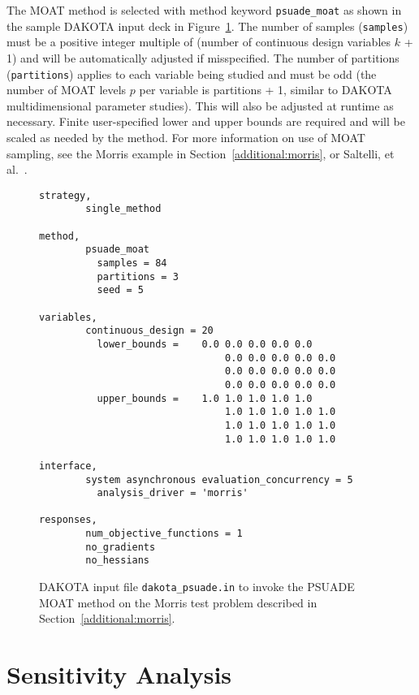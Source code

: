 The MOAT method is selected with method keyword {\tt psuade\_moat} as
shown in the sample DAKOTA input deck in Figure~\ref{FIG:moat_input}.
The number of samples ({\tt samples}) must be a positive integer
multiple of (number of continuous design variables $k$ + 1) and will
be automatically adjusted if misspecified.  The number of partitions
({\tt partitions}) applies to each variable being studied and must be
odd (the number of MOAT levels $p$ per variable is partitions + 1,
similar to DAKOTA multidimensional parameter studies).  This will also
be adjusted at runtime as necessary.  Finite user-specified lower and
upper bounds are required and will be scaled as needed by the method.
For more information on use of MOAT sampling, see the Morris example
in Section~\ref{additional:morris}, or Saltelli, et al.~\cite{Sal04}.

\begin{figure}[ht!]
\centering
\begin{bigbox}
\begin{small}
\begin{verbatim}
strategy,
        single_method

method,
        psuade_moat
          samples = 84
          partitions = 3
          seed = 5

variables,
        continuous_design = 20
          lower_bounds =    0.0 0.0 0.0 0.0 0.0
                                0.0 0.0 0.0 0.0 0.0
                                0.0 0.0 0.0 0.0 0.0
                                0.0 0.0 0.0 0.0 0.0
          upper_bounds =    1.0 1.0 1.0 1.0 1.0
                                1.0 1.0 1.0 1.0 1.0
                                1.0 1.0 1.0 1.0 1.0
                                1.0 1.0 1.0 1.0 1.0

interface,
        system asynchronous evaluation_concurrency = 5
          analysis_driver = 'morris'

responses,
        num_objective_functions = 1
        no_gradients
        no_hessians
\end{verbatim}
\end{small}
\end{bigbox}
\caption[DAKOTA input file for PSUADE
MOAT.]{\label{FIG:moat_input}DAKOTA input file {\tt dakota\_psuade.in}
to invoke the PSUADE MOAT method on the Morris test problem described in
Section~\ref{additional:morris}.}
\end{figure}


\section{Sensitivity Analysis}\label{dace:sensitivity}

